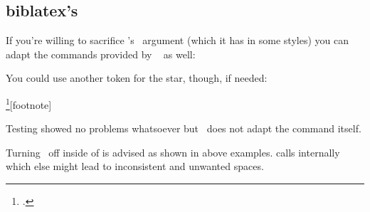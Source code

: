 \documentclass{fnpct-manual}
\begin{document}
\subsection{biblatex's }\label{sec:biblatex}
If you're willing to sacrifice 's \sarg\ argument (which it has
in some styles) you can adapt the commands provided by
~\cite{pkg:biblatex} as well:
You could use another token for the star, though, if needed:
\begin{sourcecode}
  \AdaptNote\footcite{t+oo+m}[footnote]{%
  }
\end{sourcecode}
Testing showed no problems whatsoever but \fnpct\ does not adapt the command
itself.

\begin{bewareofthedog}
  Turning \fnpct\ off inside of  is advised as shown in above
  examples.   calls  internally which else might
  lead to inconsistent and unwanted spaces.
\end{bewareofthedog}


\appendix

\printbibliography
\end{document}
